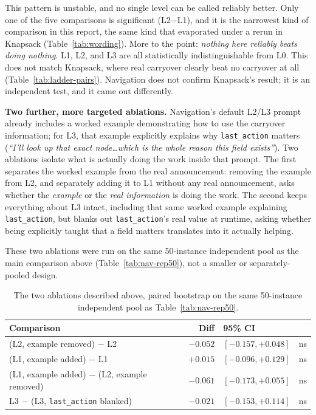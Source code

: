 \documentclass[11pt,a4paper]{article}
\newcommand{\cell}[1]{\textbf{#1}}
\begin{document}
This pattern is unstable, and no single level can be called reliably better. Only one of the
five comparisons is significant (L2$-$L1), and it is the narrowest kind of comparison in this
report, the same kind that evaporated under a rerun in Knapsack (Table~\ref{tab:wording}). More
to the point: \emph{nothing here reliably beats doing nothing}. L1, L2, and L3 are all
statistically indistinguishable from L0. This does not match Knapsack, where real carryover
clearly beat no carryover at all (Table~\ref{tab:ladder-pairs}). Navigation does not confirm
Knapsack's result; it is an independent test, and it came out differently.

\textbf{Two further, more targeted ablations.} Navigation's default L2/L3 prompt already
includes a worked example demonstrating how to use the carryover information; for L3, that
example explicitly explains why \texttt{last\_action} matters (\textit{``I'll look up that exact
node\ldots which is the whole reason this field exists''}). Two ablations isolate what is
actually doing the work inside that prompt. The first separates the worked example from the real
announcement: removing the example from L2, and separately adding it to L1 without any real
announcement, asks whether the \emph{example} or the \emph{real information} is doing the work.
The second keeps everything about L3 intact, including that same worked example explaining
\texttt{last\_action}, but blanks out \texttt{last\_action}'s real value at runtime, asking
whether being explicitly taught that a field matters translates into it actually helping.

These two ablations were run on the same 50-instance independent pool as the main comparison
above (Table~\ref{tab:nav-rep50}), not a smaller or separately-pooled design.

\begin{table}[H]
\centering
\small
\begin{tabular}{@{}lrll@{}}
\toprule
\cell{Comparison} & \cell{Diff} & \cell{95\% CI} & \\
\midrule
(L2, example removed) $-$ L2 & $-0.052$ & $[-0.157,+0.048]$ & ns \\
(L1, example added) $-$ L1 & $+0.015$ & $[-0.096,+0.129]$ & ns \\
(L1, example added) $-$ (L2, example removed) & $-0.061$ & $[-0.173,+0.055]$ & ns \\
L3 $-$ (L3, \texttt{last\_action} blanked) & $-0.021$ & $[-0.153,+0.114]$ & ns \\
\bottomrule
\end{tabular}
\caption{The two ablations described above, paired bootstrap on the same 50-instance
independent pool as Table~\ref{tab:nav-rep50}.}
\label{tab:nav-ablation}
\end{table}
\end{document}
